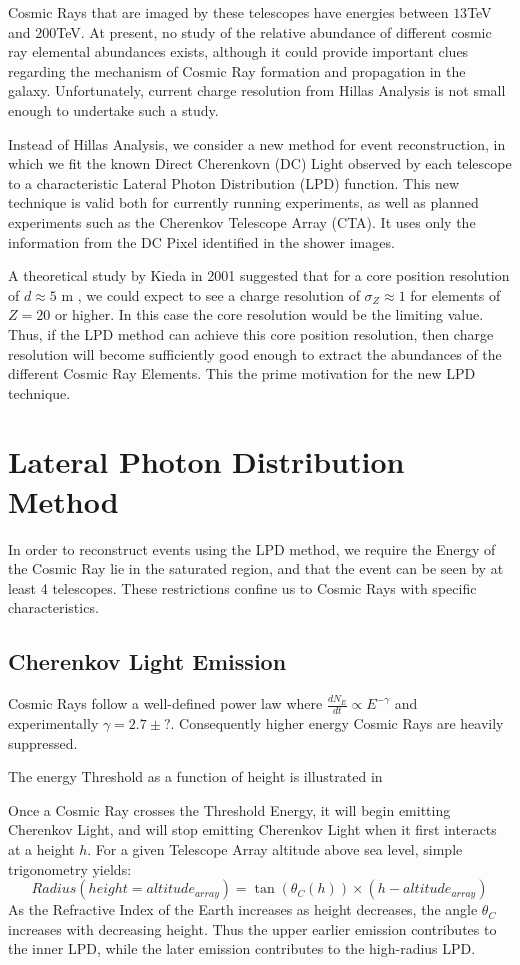 \documentclass{article}
\begin{document}
Cosmic Rays that are imaged by these telescopes have energies between $13 $TeV and $200 $TeV. At present, no study of the relative abundance of different cosmic ray elemental abundances exists, although it could provide important clues regarding the mechanism of Cosmic Ray formation and propagation in the galaxy. Unfortunately, current charge resolution from Hillas Analysis is not small enough to undertake such a study.

Instead of Hillas Analysis, we consider a new method for event reconstruction, in which we fit the known Direct Cherenkovn (DC) Light observed by each telescope to a characteristic Lateral Photon Distribution (LPD) function. This new technique is valid both for currently running experiments, as well as planned experiments such as the Cherenkov Telescope Array (CTA). It uses only the information from the DC Pixel identified in the shower images.

A theoretical study by Kieda in 2001 \cite{kieda01} suggested that for a core position resolution of $d \approx 5 $ m , we could expect to see a charge resolution of $ \sigma_{Z} \approx 1 $ for elements of $Z = 20$ or higher. In this case the core resolution would be the limiting value. Thus, if the LPD method can achieve this core position resolution, then charge resolution will become sufficiently good enough to extract the abundances of the different Cosmic Ray Elements. This the prime motivation for the new LPD technique.

\section{Lateral Photon Distribution Method}
In order to reconstruct events using the LPD method, we require the Energy of the Cosmic Ray lie in the saturated region, and that the event can be seen by at least 4 telescopes. These restrictions confine us to Cosmic Rays with specific characteristics.

\subsection{Cherenkov Light Emission}
Cosmic Rays follow a well-defined power law where $ \frac{dN_{E}}{dt} \propto E^{-\gamma} $ and experimentally $ \gamma = 2.7 \pm ? $. Consequently higher energy Cosmic Rays are heavily suppressed. 

The energy Threshold as a function of height is illustrated in

Once a Cosmic Ray crosses the Threshold Energy, it will begin emitting Cherenkov Light, and will stop emitting Cherenkov Light when it first interacts at a height $h$. For a given Telescope Array altitude above sea level, simple trigonometry yields:
\[ Radius(height = altitude_{array}) = \tan (\theta_{C}(h)) \times (h - altitude_{array})\]
As the Refractive Index of the Earth increases as height decreases, the angle $\theta_{C}$ increases with decreasing height. Thus the upper earlier emission contributes to the inner LPD, while the later emission contributes to the high-radius LPD. 
\end{document}
